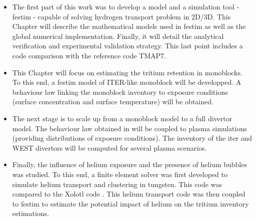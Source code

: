 \begin{itemize}
    \item \textbf{} \newline
The first part of this work was to develop a model and a simulation tool - \gls{festim} - capable of solving hydrogen transport problem in 2D/3D.
This Chapter will describe the mathematical models used in \gls{festim} as well as the global numerical implementation.
Finally, it will detail the analytical verification and experimental validation strategy.
This last point includes a code comparison with the reference code TMAP7.
    \item \textbf{} \newline
This Chapter will focus on estimating the tritium \gls{retention} in \glspl{monoblock}.
To this end, a \gls{festim} model of ITER-like \gls{monoblock} will be developped.
A behaviour law linking the \gls{monoblock} \gls{inventory} to exposure conditions (surface concentration and surface temperature) will be obtained.
    \item \textbf{} \newline
The next stage is to scale up from a \gls{monoblock} model to a full \gls{divertor} model.
The behaviour law obtained in  will be coupled to \gls{plasma} simulations (providing distributions of exposure conditions).
The \gls{inventory} of the \acrshort{iter} and WEST \glspl{divertor} will be computed for several \gls{plasma} scenarios.
    \item \textbf{} \newline
Finally, the influence of helium exposure and the presence of helium bubbles was studied.
To this end, a finite element solver was first developed to simulate helium transport and clustering in tungsten.
This code was compared to the Xolotl code .
This helium transport code was then coupled to \gls{festim} to estimate the potential impact of helium on the tritium \gls{inventory} estimations.
\end{itemize}
